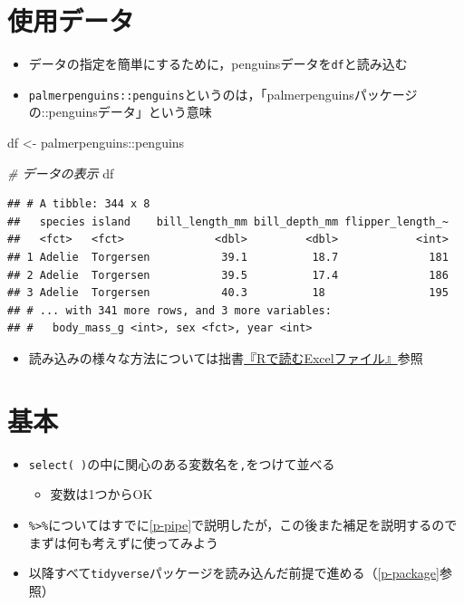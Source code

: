 \documentclass[
  xelatex,ja=standard, b5paper]{bxjsbook}
\newenvironment{Shaded}{\begin{snugshade}}{\end{snugshade}}
\newcommand{\CommentTok}[1]{\textcolor[rgb]{0.56,0.35,0.01}{\textit{#1}}}
\newcommand{\NormalTok}[1]{#1}
\newcommand{\OtherTok}[1]{\textcolor[rgb]{0.56,0.35,0.01}{#1}}
\newcommand{\SpecialCharTok}[1]{\textcolor[rgb]{0.00,0.00,0.00}{#1}}
\providecommand{\tightlist}{%
  \setlength{\itemsep}{0pt}\setlength{\parskip}{0pt}}
\begin{document}
\hypertarget{select-read}{%
\section{使用データ}\label{select-read}}

\begin{itemize}
\tightlist
\item
  データの指定を簡単にするために，penguinsデータを\texttt{df}と読み込む
\item
  \texttt{palmerpenguins::penguins}というのは，「palmerpenguinsパッケージの::penguinsデータ」という意味
\end{itemize}

\begin{Shaded}
\begin{Highlighting}[]
\NormalTok{df }\OtherTok{\textless{}{-}} 
\NormalTok{  palmerpenguins}\SpecialCharTok{::}\NormalTok{penguins}

\CommentTok{\# データの表示  }
\NormalTok{df }
\end{Highlighting}
\end{Shaded}

\begin{verbatim}
## # A tibble: 344 x 8
##   species island    bill_length_mm bill_depth_mm flipper_length_~
##   <fct>   <fct>              <dbl>         <dbl>            <int>
## 1 Adelie  Torgersen           39.1          18.7              181
## 2 Adelie  Torgersen           39.5          17.4              186
## 3 Adelie  Torgersen           40.3          18                195
## # ... with 341 more rows, and 3 more variables:
## #   body_mass_g <int>, sex <fct>, year <int>
\end{verbatim}

\begin{itemize}
\tightlist
\item
  読み込みの様々な方法については拙書\href{https://izunyan.github.io/excel_r/}{『Rで読むExcelファイル』}参照
\end{itemize}

\hypertarget{select-standard}{%
\section{基本}\label{select-standard}}

\begin{itemize}
\tightlist
\item
  \texttt{select(\ )}の中に関心のある変数名を\texttt{,}をつけて並べる

  \begin{itemize}
  \tightlist
  \item
    変数は1つからOK
  \end{itemize}
\item
  \texttt{\%\textgreater{}\%}についてはすでに\ref{p-pipe}で説明したが，この後また補足を説明するのでまずは何も考えずに使ってみよう
\item
  以降すべて\texttt{tidyverse}パッケージを読み込んだ前提で進める（\ref{p-package}参照）
\end{itemize}
\end{document}
